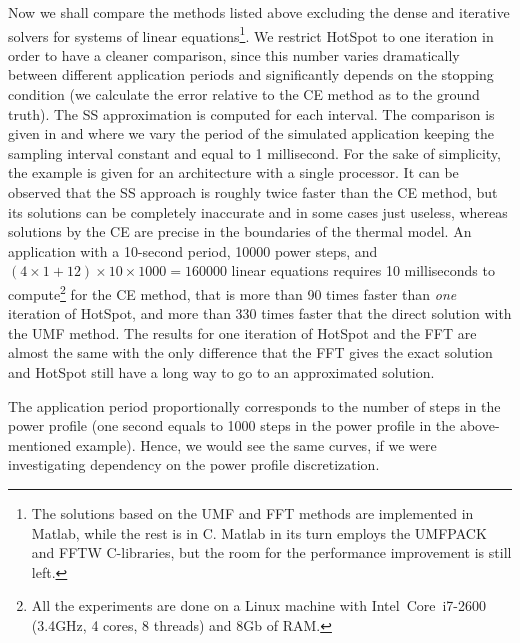 Now we shall compare the methods listed above excluding the dense and iterative solvers for systems of linear equations\footnote{The solutions based on the UMF and FFT methods are implemented in Matlab, while the rest is in C. Matlab in its turn employs the UMFPACK and FFTW C-libraries, but the room for the performance improvement is still left.}. We restrict HotSpot to one iteration in order to have a cleaner comparison, since this number varies dramatically between different application periods and significantly depends on the stopping condition (we calculate the error relative to the CE method as to the ground truth). The SS approximation is computed for each interval. The comparison is given in  and  where we vary the period of the simulated application keeping the sampling interval constant and equal to 1 millisecond. For the sake of simplicity, the example is given for an architecture with a single processor. It can be observed that the SS approach is roughly twice faster than the CE method, but its solutions can be completely inaccurate and in some cases just useless, whereas solutions by the CE are precise in the boundaries of the thermal model. An application with a 10-second period, 10000 power steps, and $(4 \times 1 + 12) \times 10 \times 1000 = 160000$ linear equations requires 10 milliseconds to compute\footnote{All the experiments are done on a Linux machine with Intel\textregistered\ Core\texttrademark\ i7-2600 (3.4GHz, 4 cores, 8 threads) and 8Gb of RAM.} for the CE method, that is more than 90 times faster than \emph{one} iteration of HotSpot, and more than 330 times faster that the direct solution with the UMF method. The results for one iteration of HotSpot and the FFT are almost the same with the only difference that the FFT gives the exact solution and HotSpot still have a long way to go to an approximated solution.

The application period proportionally corresponds to the number of steps in the power profile (one second equals to 1000 steps in the power profile in the above-mentioned example). Hence, we would see the same curves, if we were investigating dependency on the power profile discretization.

